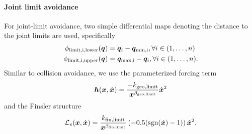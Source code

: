 \paragraph{Joint limit avoidance}
For joint-limit avoidance, two simple differential maps
denoting the distance to the joint limits are used, specifically
\begin{align*}
    \phi_{\textrm{limit,i,lower}}(\bm{q}) &= \bm{q}_{i} - \bm{q}_{\textrm{min,i}},\forall i \in (1,\dots,n)\\
    \phi_{\textrm{limit,i,upper}}(\bm{q}) &= \bm{q}_{\textrm{max,i}} - \bm{q}_i,\forall i \in (1,\dots,n).
\end{align*}
Similar to collision avoidance, we use the parameterized forcing term
\begin{equation}
    \bm{h}(\bm{x},\dot{\bm{x}}) = \frac{-k_{\textrm{geo,limit}}}{\bm{x}^{\beta_{\textrm{geo,limit}}}}\dot{\bm{x}}^2
\end{equation}
and the Finsler structure
\begin{equation}
    \mathcal{L}_e(\bm{x},\dot{\bm{x}}) = \frac{k_{\textrm{fin,limit}}}{\bm{x}^{\beta_{\textrm{fin,limit}}}} \left(-0.5 (\textrm{sgn}(\dot{\bm{x}}) - 1)\right) \dot{\bm{x}}^2.
\end{equation}

%
